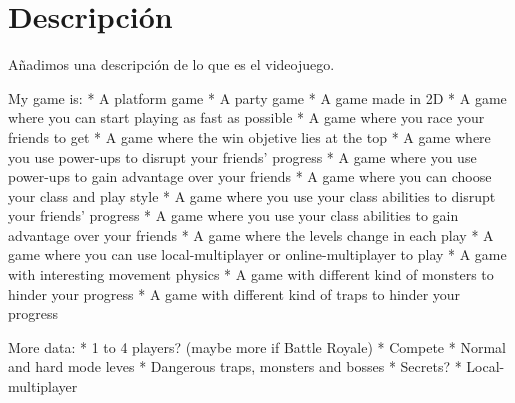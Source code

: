 \chapter{Descripción}
Añadimos una descripción de lo que es el videojuego.


My game is:
* A platform game
* A party game
* A game made in 2D
* A game where you can start playing as fast as possible
* A game where you race your friends to get
* A game where the win objetive lies at the top
* A game where you use power-ups to disrupt your friends' progress
* A game where you use power-ups to gain advantage over your friends
* A game where you can choose your class and play style
* A game where you use your class abilities to disrupt your friends' progress
* A game where you use your class abilities to gain advantage over your friends
* A game where the levels change in each play
* A game where you can use local-multiplayer or online-multiplayer to play
* A game with interesting movement physics
* A game with different kind of monsters to hinder your progress
* A game with different kind of traps to hinder your progress

More data:
* 1 to 4 players? (maybe more if Battle Royale)
* Compete
* Normal and hard mode leves
* Dangerous traps, monsters and bosses
* Secrets?
* Local-multiplayer